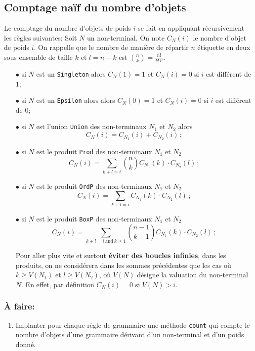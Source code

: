 \documentclass[11pt]{article}
\renewcommand{\emph}[1]{\textbf{#1}}
\newcounter{asuivre}
\newenvironment{asks}{\begin{enumerate}\setcounter{enumi}{\theasuivre}}%
                       {\setcounter{asuivre}{\theenumi}\end{enumerate}}
\begin{document}
\subsection{Comptage naïf du nombre d'objets}

Le comptage du nombre d'objets de poids $i$ se fait en appliquant
récursivement les règles suivantes:
Soit $N$ un non-terminal. On note $C_N(i)$ le nombre d'objet de poids $i$.
On rappelle que le nombre de manière de répartir $n$ étiquette en deux sous
ensemble de taille $k$ et $l=n-k$ est $\binom{n}{k} = \frac{n!}{k!\,l!}$.
\begin{itemize}
\item[$\bullet$] si $N$ est un \texttt{Singleton} alors $C_N(1) = 1$ et $C_N(i)
  = 0$ si $i$ est différent de $1$;
\item[$\bullet$] si $N$ est un \texttt{Epsilon} alors alors $C_N(0) = 1$ et
  $C_N(i) = 0$ si $i$ est différent de $0$;
\item[$\bullet$] si $N$ est l'union \texttt{Union} des non-terminaux $N_1$ et
  $N_2$ alors
  $$C_N(i) = C_{N_1}(i) + C_{N_2}(i)\,;$$
\item[$\bullet$] si $N$ est le produit \texttt{Prod} des non-terminaux $N_1$ et
  $N_2$
  $$C_N(i) = \sum_{k+l=i} \binom{n}{k} C_{N_1}(k) \cdot C_{N_2}(l)\,;$$
\item[$\bullet$] si $N$ est le produit \texttt{OrdP} des non-terminaux $N_1$ et
  $N_2$
  $$C_N(i) = \sum_{k+l=i} C_{N_1}(k) \cdot C_{N_2}(l)\,;$$
\item[$\bullet$] si $N$ est le produit \texttt{BoxP} des non-terminaux $N_1$ et
  $N_2$
  $$C_N(i) = \sum_{k+l=i\ \text{and}\ k \geq 1}
  \binom{n-1}{k-1} C_{N_1}(k) \cdot C_{N_2}(l)\,;$$

  Pour aller plus vite et surtout \emph{éviter des boucles infinies}, dans les
  produits, on ne considérera dans les sommes précédentes que les cas où $k \geq
  V(N_1)$ et $l \geq V(N_2)$, où $V(N)$ désigne la valuation du non-terminal
  $N$. En effet, par définition $C_N(i) = 0$ si $V(N) > i$.
\end{itemize}

\subsubsection{À faire:}
\begin{asks}
\item Implanter pour chaque règle de grammaire une méthode
  \texttt{count} qui compte le nombre d'objets d'une grammaire dérivant
  d'un non-terminal et d'un poids donné.
\end{asks}
\end{document}
